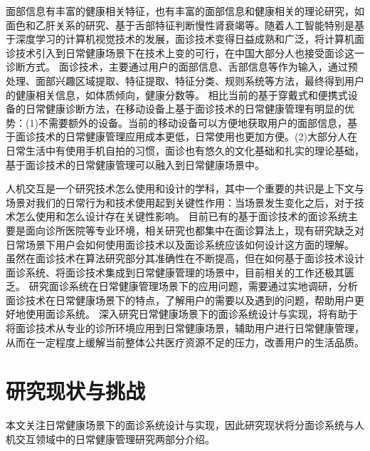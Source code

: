 
面部信息有丰富的健康相关特征\cite{ding2019reading}，也有丰富的面部信息和健康相关的理论研究，如面色和乙肝关系的研究\cite{吴秀艳2014108}、基于舌部特征判断慢性肾衰竭\cite{周小芳2018慢性肾衰患者虚兼湿浊证的口唇特征研究}等。随着人工智能特别是基于深度学习的计算机视觉技术\cite{hassaballah2020deep}的发展，面诊技术变得日益成熟和广泛，将计算机面诊技术引入到日常健康场景下在技术上变的可行，在中国大部分人也接受面诊这一诊断方式。
面诊技术，主要通过用户的面部信息、舌部信息等作为输入，通过预处理、面部兴趣区域提取、特征提取、特征分类、规则系统等方法，最终得到用户的健康相关信息，如体质倾向，健康分数等\cite{林锋2019中医面诊系统调研报告}。
相比当前的基于穿戴式和便携式设备的日常健康诊断方法，在移动设备上基于面诊技术的日常健康管理有明显的优势：(1)不需要额外的设备。当前的移动设备可以方便地获取用户的面部信息，基于面诊技术的日常健康管理应用成本更低，日常使用也更加方便。(2)大部分人在日常生活中有使用手机自拍的习惯，面诊也有悠久的文化基础和扎实的理论基础，基于面诊技术的日常健康管理可以融入到日常健康场景中。

人机交互是一个研究技术怎么使用和设计的学科，其中一个重要的共识是上下文与场景对我们的日常行为和技术使用起到关键性作用：当场景发生变化之后，对于技术怎么使用和怎么设计存在关键性影响\cite{1987Plans}。
目前已有的基于面诊技术的面诊系统主要是面向诊所医院等专业环境，相关研究也都集中在面诊算法上，现有研究缺乏对日常场景下用户会如何使用面诊技术以及面诊系统应该如何设计这方面的理解。
虽然在面诊技术在算法研究部分其准确性在不断提高，但在如何基于面诊技术设计面诊系统、将面诊技术集成到日常健康管理的场景中，目前相关的工作还极其匮乏。
研究面诊系统在日常健康管理场景下的应用问题，需要通过实地调研，分析面诊技术在日常健康场景下的特点，了解用户的需要以及遇到的问题，帮助用户更好地使用面诊系统。
深入研究日常健康场景下的面诊系统设计与实现，将有助于将面诊技术从专业的诊所环境应用到日常健康场景，辅助用户进行日常健康管理，从而在一定程度上缓解当前整体公共医疗资源不足的压力，改善用户的生活品质。

\section{研究现状与挑战}
本文关注日常健康场景下的面诊系统设计与实现，因此研究现状将分面诊系统与人机交互领域中的日常健康管理研究两部分介绍。

